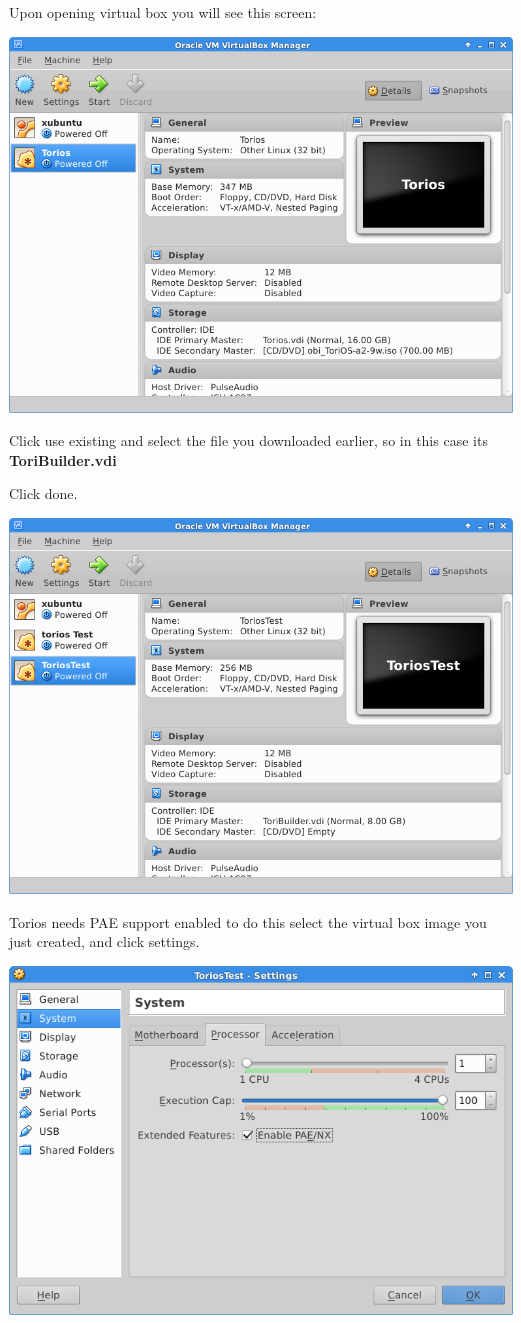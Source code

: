 \documentclass[12pt,a4paper]{book}
\begin{document}
Upon opening virtual box you will see this screen:
\begin{center}
\includegraphics[width=0.7\linewidth]{virtualbox}
\end{center}

Click use existing and select the file you downloaded earlier, so in this case its \textbf{ToriBuilder.vdi}

Click done.

\begin{center}
\includegraphics[width=0.7\linewidth]{ToriosTest-done}
\end{center}

Torios needs PAE support enabled to do this select the virtual box image you just created,  and click settings.

\begin{center}
\includegraphics[width=0.7\linewidth]{ToriosEnablePAE}
\end{center}
\end{document}
